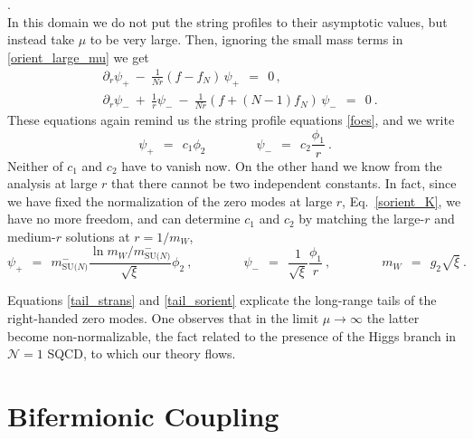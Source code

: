 \documentclass[12pt]{article}
\newcommand{\none}{${\mathcal N}=1$ }
\newcommand{\p}{\partial}
\newcommand{\mNm}{m_\text{SU($N$)}^{-}}
\begin{document}
	{.}\\[2mm]
In this domain we do not put the string profiles to their asymptotic values, but instead
	take $ \mu $ to be very large.
	Then, ignoring the small mass terms in \eqref{orient_large_mu} we get
\begin{align*}
%
	& \p_r \psi_+ ~-~ \frac{1}{Nr}(f - f_N)\, \psi_+ ~~=~~ 0\,, \\[2mm]
%
	& \p_r \psi_- ~+~ \frac{1}{r}\psi_- ~-~ \frac{1}{Nr}(f + (N-1)f_N)\, \psi_- ~~=~~0~.
\end{align*}
	These equations again remind us the string profile equations \eqref{foes}, and we write
\[
	\psi_+ ~~=~~ c_1 \phi_2 \qquad\qquad	\psi_- ~~=~~ c_2 \frac{\phi_1}{r}~.
\]
	Neither of $ c_1 $ and $ c_2 $ have to vanish now.
	On the other hand we know from the analysis at large $ r $ that there cannot be two independent
	constants.
	In fact, since we have fixed the normalization of the zero modes at large $ r $, Eq.~\eqref{sorient_K}, 
	we have no more freedom, and can determine $ c_1 $ and $ c_2 $ by matching the large-$r$
	and medium-$r$ solutions at $ r = 1/m_W $,
\begin{equation}
\label{tail_sorient}
	\psi_+ ~~=~~ \mNm \frac{\ln m_W/\mNm}{\sqrt{\xi}} \phi_2~,
	\qquad\qquad
	\psi_- ~~=~~ \frac{1}{\sqrt{\xi}} \frac{\phi_1}{r}~,
	\qquad\qquad
	m_W ~~=~~ g_2\sqrt{\xi}~.
\end{equation}
	
	Equations \eqref{tail_strans} and \eqref{tail_sorient} explicate the long-range tails of the
	right-handed zero modes.
	One observes that in the limit $ \mu \to \infty $ the latter become non-nor\-ma\-li\-za\-ble, the fact
	related to the presence of the Higgs branch in \none SQCD, to which our theory flows.
	

\section{Bifermionic Coupling}
\label{BC}
\setcounter{equation}{0}
\end{document}
